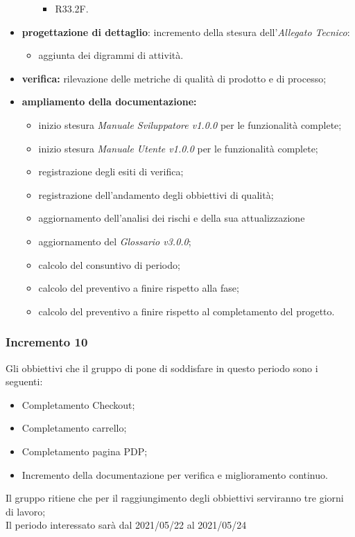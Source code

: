 \begin{itemize}
\begin{itemize}
\begin{itemize}
                        \item R33.2F.
                    \end{itemize}
          \end{itemize}
    \item \textbf{progettazione di dettaglio}: incremento della stesura dell'\textit{Allegato Tecnico}:
          \begin{itemize}
              \item aggiunta dei digrammi di attività.
          \end{itemize}
    \item \textbf{verifica:} rilevazione delle metriche di qualità di prodotto e di processo;
    \item \textbf{ampliamento della documentazione:}
          \begin{itemize}
              \item inizio stesura \textit{Manuale Sviluppatore v1.0.0} per le funzionalità complete;
              \item inizio stesura \textit{Manuale Utente v1.0.0} per le funzionalità complete;
              \item registrazione degli esiti di verifica;
              \item registrazione dell'andamento degli obbiettivi di qualità;
              \item aggiornamento dell'analisi dei rischi e della sua attualizzazione
              \item aggiornamento del \textit{Glossario v3.0.0};
              \item calcolo del consuntivo di periodo;
              \item calcolo del preventivo a finire rispetto alla fase;
              \item calcolo del preventivo a finire rispetto al completamento del progetto.
          \end{itemize}
\end{itemize}

\subsubsection{Incremento 10}
Gli obbiettivi che il gruppo di pone di soddisfare in questo periodo sono i seguenti:
\begin{itemize}
    \item Completamento Checkout;
    \item Completamento carrello;
    \item Completamento pagina PDP;
    \item Incremento della documentazione per verifica e miglioramento continuo.
\end{itemize}
Il gruppo ritiene che per il raggiungimento degli obbiettivi serviranno tre giorni di lavoro;\\
Il periodo interessato sarà dal 2021/05/22 al 2021/05/24

